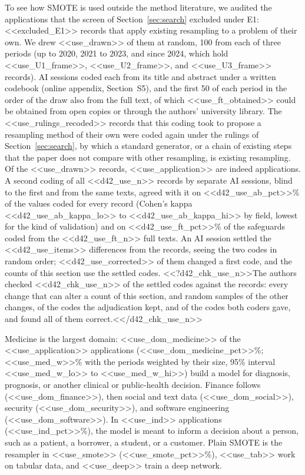 To see how SMOTE is used outside the method literature, we audited the applications that the screen of Section~\ref{sec:search} excluded under E1: <<excluded_E1>> records that apply existing resampling to a problem of their own. We drew <<use_drawn>> of them at random, 100 from each of three periods (up to 2020, 2021 to 2023, and since 2024, which hold <<use_U1_frame>>, <<use_U2_frame>>, and <<use_U3_frame>> records). AI sessions coded each from its title and abstract under a written codebook (online appendix, Section~S5), and the first 50 of each period in the order of the draw also from the full text, of which <<use_ft_obtained>> could be obtained from open copies or through the authors' university library. The <<use_rulings_recoded>> records that this coding took to propose a resampling method of their own were coded again under the rulings of Section~\ref{sec:search}, by which a standard generator, or a chain of existing steps that the paper does not compare with other resampling, is existing resampling. Of the <<use_drawn>> records, <<use_application>> are indeed applications. A second coding of all <<d42_use_n>> records by separate AI sessions, blind to the first and from the same texts, agreed with it on <<d42_use_ab_pct>>\% of the values coded for every record (Cohen's kappa <<d42_use_ab_kappa_lo>> to <<d42_use_ab_kappa_hi>> by field, lowest for the kind of validation) and on <<d42_use_ft_pct>>\% of the safeguards coded from the <<d42_use_ft_n>> full texts. An AI session settled the <<d42_use_items>> differences from the records, seeing the two codes in random order; <<d42_use_corrected>> of them changed a first code, and the counts of this section use the settled codes. <<?d42_chk_use_n>>The authors checked <<d42_chk_use_n>> of the settled codes against the records: every change that can alter a count of this section, and random samples of the other changes, of the codes the adjudication kept, and of the codes both coders gave, and found all of them correct.<</d42_chk_use_n>>

Medicine is the largest domain: <<use_dom_medicine>> of the <<use_application>> applications (<<use_dom_medicine_pct>>\%; <<use_med_w>>\% with the periods weighted by their size, 95\% interval <<use_med_w_lo>> to <<use_med_w_hi>>) build a model for diagnosis, prognosis, or another clinical or public-health decision. Finance follows (<<use_dom_finance>>), then social and text data (<<use_dom_social>>), security (<<use_dom_security>>), and software engineering (<<use_dom_software>>). In <<use_ind>> applications (<<use_ind_pct>>\%), the model is meant to inform a decision about a person, such as a patient, a borrower, a student, or a customer. Plain SMOTE is the resampler in <<use_smote>> (<<use_smote_pct>>\%), <<use_tab>> work on tabular data, and <<use_deep>> train a deep network.

